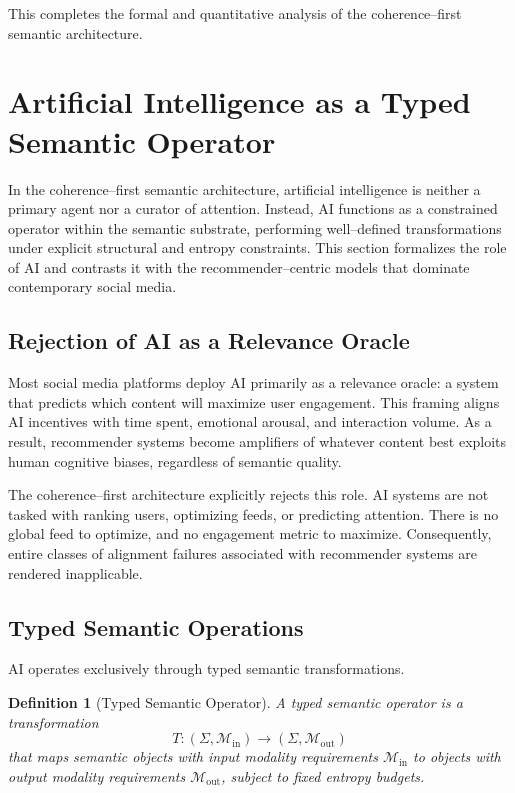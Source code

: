 \documentclass[11pt]{article}
\newtheorem{definition}{Definition}
\begin{document}
This completes the formal and quantitative analysis of the coherence--first semantic
architecture.

\section{Artificial Intelligence as a Typed Semantic Operator}

In the coherence--first semantic architecture, artificial intelligence is neither a
primary agent nor a curator of attention. Instead, AI functions as a constrained operator
within the semantic substrate, performing well--defined transformations under explicit
structural and entropy constraints. This section formalizes the role of AI and contrasts
it with the recommender--centric models that dominate contemporary social media.

\subsection{Rejection of AI as a Relevance Oracle}

Most social media platforms deploy AI primarily as a relevance oracle: a system that
predicts which content will maximize user engagement. This framing aligns AI incentives
with time spent, emotional arousal, and interaction volume. As a result, recommender
systems become amplifiers of whatever content best exploits human cognitive biases,
regardless of semantic quality.

The coherence--first architecture explicitly rejects this role. AI systems are not tasked
with ranking users, optimizing feeds, or predicting attention. There is no global feed to
optimize, and no engagement metric to maximize. Consequently, entire classes of alignment
failures associated with recommender systems are rendered inapplicable.

\subsection{Typed Semantic Operations}

AI operates exclusively through typed semantic transformations.

\begin{definition}[Typed Semantic Operator]
A typed semantic operator is a transformation
\[
T : (\Sigma, \mathcal{M}_{\text{in}}) \rightarrow (\Sigma, \mathcal{M}_{\text{out}})
\]
that maps semantic objects with input modality requirements $\mathcal{M}_{\text{in}}$ to
objects with output modality requirements $\mathcal{M}_{\text{out}}$, subject to fixed
entropy budgets.
\end{definition}
\end{document}

